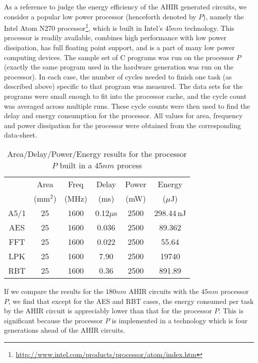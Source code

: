 \documentclass[conference]{IEEEtran}
\begin{document}
As a reference to judge the energy efficiency of the AHIR generated
circuits, we consider a popular low power processor (henceforth
denoted by $P$), namely the Intel Atom N270
processor\footnote{\url{http://www.intel.com/products/processor/atom/index.htm}},
which is built in Intel's $45nm$ technology. This processor is readily
available, combines high performance with low power dissipation, has
full floating point support, and is a part of many low power computing
devices. The sample set of C programs was run on the processor $P$
(exactly the same program used in the hardware generation was run on
the processor). In each case, the number of cycles needed to finish
one task (as described above) specific to that program was measured.
The data sets for the programs were small enough to fit into the
processor cache, and the cycle count was averaged across multiple
runs. These cycle counts were then used to find the delay and energy
consumption for the processor. All values for area, frequency and
power dissipation for the processor were obtained from the
corresponding data-sheet.

\begin{table}[htb]
  \centering
  \caption{Area/Delay/Power/Energy results for the processor $P$ built in a $45nm$ process}
  \label{table:atom-power-delay}
  \renewcommand\arraystretch{1.2}
  \setlength{\tabcolsep}{1ex}
  \begin{tabular}{c|c|c|c|c|c}
    \hline
    & Area & Freq & Delay & Power & Energy \\
    & (mm$^2$) & (MHz) & (ms) & (mW) & ($\mu$J) \\
    \hline
    \hline
    A5/1 & 25 & 1600 & 0.12$\mu$s & 2500 & 298.44\,nJ  \\
    \hline
    AES & 25 & 1600 & 0.036 & 2500 & 89.362 \\
    \hline
    FFT & 25 & 1600 & 0.022 & 2500 & 55.64  \\
    \hline
    LPK & 25 & 1600 & 7.90 & 2500 & 19740  \\
    \hline
    RBT & 25 & 1600 & 0.36 & 2500 & 891.89 \\
    \hline
  \end{tabular}

\end{table}

If we compare the results for the $180nm$ AHIR circuits with
the $45nm$ processor $P$, we find that except for the AES and
RBT cases,
the energy consumed per task by the AHIR circuit is appreciably
lower than that for the processor $P$.  This is significant
because the processor $P$ is implemented in a technology which
is four generations ahead of the AHIR circuits.  
\end{document}
